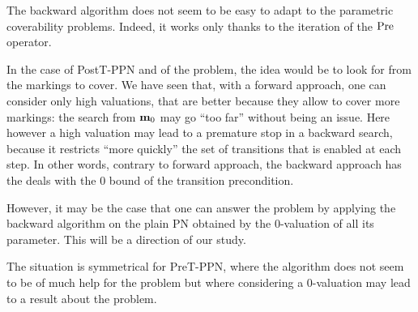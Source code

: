 The backward algorithm does not seem to be easy to adapt to the parametric coverability problems.
Indeed, it works only thanks to the iteration of the $\operatorname{Pre}$ operator.

In the case of PostT-\ac{PPN} and of the \Ecov problem, the idea would be to look for \mari from the markings to cover.
We have seen that, with a forward approach, one can consider only high valuations, that are better because they allow to cover more markings: the search from $\mathbf{m}_0$ may go ``too far'' without being an issue.
Here however a high valuation may lead to a premature stop in a backward search, because it restricts ``more quickly'' the set of transitions that is enabled at each step.
In other words, contrary to forward approach, the backward approach has the deals with the 0 bound of the transition precondition. 

However, it may be the case that one can answer the \Ucov problem by applying the backward algorithm on the plain \ac{PN} obtained by the 0-valuation of all its parameter.
This will be a direction of our study.

The situation is symmetrical for PreT-\ac{PPN}, where the algorithm does not seem to be of much help for the \Ucov problem but where considering a 0-valuation may lead to a result about the \Ecov problem.

